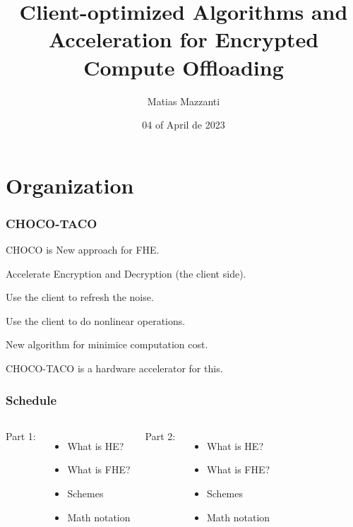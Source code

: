 \documentclass[10pt,handout]{beamer}
\title[CHOCO]{Client-optimized Algorithms and Acceleration for Encrypted Compute Offloading}
\author[Matias Mazzanti]{Matias Mazzanti}
\institute{}
\date{04 of April de 2023}
\begin{document}
\begin{frame}

\maketitle

\end{frame}


\section{Organization}


%
%
%
%
%
%

\begin{frame}
    \frametitle{CHOCO-TACO}

    CHOCO is New approach for FHE.

    Accelerate Encryption and Decryption (the client side).

    Use the client to refresh the noise.

    Use the client to do nonlinear operations.

    New algorithm for minimice computation cost.

    CHOCO-TACO is a hardware accelerator for this.
\end{frame}
\begin{frame}[noframenumbering]
    \frametitle{Schedule}
\begin{columns}
    Part 1:
    \begin{itemize}
        \item What is HE?
        \item What is FHE?
        \item Schemes
        \item Math notation
    \end{itemize}

    Part 2:
    \begin{itemize}
        \item What is HE?
        \item What is FHE?
        \item Schemes
        \item Math notation
    \end{itemize}
\end{columns}

\end{frame}
\end{document}
